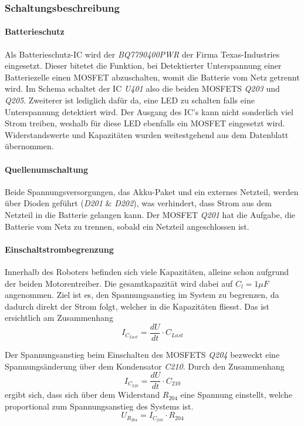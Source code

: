 \documentclass[main.tex]{subfiles} %
\begin{document}
\subsubsection{Schaltungsbeschreibung}

\paragraph{Batterieschutz}
Als Batterieschutz-IC wird der \textit{BQ7790400PWR} der Firma Texas-Industries
eingesetzt. Dieser bitetet die Funktion, bei Detektierter Unterspannung einer
Batteriezelle einen MOSFET abzuschalten, womit die Batterie vom Netz getrennt
wird. Im Schema schaltet der IC \textit{U401} also die beiden MOSFETS
\textit{Q203} und \textit{Q205}. Zweiterer ist lediglich dafür da, eine LED zu
schalten falls eine Unterspannung detektiert wird. Der Ausgang des IC's kann
nicht sonderlich viel Strom treiben, weshalb für diese LED ebenfalls ein MOSFET
eingesetzt wird. Widerstandswerte und Kapazitäten wurden weitestgehend aus dem
Datenblatt übernommen.

\paragraph{Quellenumschaltung}
Beide Spannungsversorgungen, das Akku-Paket und ein externes Netzteil, werden
über Dioden geführt (\textit{D201} \& \textit{D202}), was verhindert, dass
Strom aus dem Netzteil in die Batterie gelangen kann. Der MOSFET \textit{Q201}
hat die Aufgabe, die Batterie vom Netz zu trennen, sobald ein Netzteil
angeschlossen ist.

\paragraph{Einschaltstrombegrenzung}
Innerhalb des Roboters befinden sich viele Kapazitäten, alleine schon aufgrund
der beiden Motorentreiber. Die gesamtkapazität wird dabei auf $C_l = 1 \mu F$
angenommen. Ziel ist es, den Spannungsanstieg im System zu begrenzen, da
dadurch direkt der Strom folgt, welcher in die Kapazitäten fliesst. Das ist
ersichtlich am Zusammenhang
\[
    I_{C_{Last}}  = \frac{dU}{dt} \cdot C_{Last}
\]

Der Spannungsanstieg beim Einschalten des MOSFETS \textit{Q204} bezweckt eine
Spannungsänderung über dem Kondensator \textit{C210}. Durch den Zusammenhang
\[
    I_{C_{210}}  = \frac{dU}{dt} \cdot C_{210}
\]
ergibt sich, dass sich über dem Widerstand $R_{204}$ eine Spannung einstellt,
welche proportional zum Spannungsanstieg des Systems ist.
\[
    U_{R_{204}} = I_{C_{210}} \cdot R_{204}
\]
\end{document}
